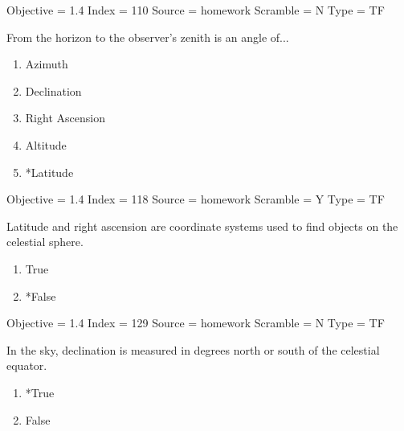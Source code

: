 \documentclass[11pt]{article}
\begin{document}
\begin{enumerate}
\begin{minipage}{\textwidth}
\begin{minipage}{\textwidth}
Objective = 1.4
Index = 110
Source = homework
Scramble = N
Type = TF
\end{minipage}
\end{minipage}
\vskip 0.20in

\begin{minipage}{\textwidth}
\begin{minipage}{\textwidth}
\item From the horizon to the observer's zenith is an angle of...
\begin{multicols}{3}
\begin{enumerate} 
\setlength{\itemsep}{1pt} 
\setlength{\parskip}{0pt} 
\setlength{\parsep}{0pt}
\setlength{\multicolsep}{1pt} 
\item Azimuth
\item Declination
\item Right Ascension
\item Altitude
\item *Latitude
\end{enumerate} 
\vfill 
\end{multicols}

Objective = 1.4
Index = 118
Source = homework
Scramble = Y
Type = TF
\end{minipage}
\end{minipage}
\vskip 0.20in

\begin{minipage}{\textwidth}
\begin{minipage}{\textwidth}
\item Latitude and right ascension are coordinate systems used to find objects on the celestial sphere.
\begin{multicols}{3}
\begin{enumerate} 
\setlength{\itemsep}{1pt} 
\setlength{\parskip}{0pt} 
\setlength{\parsep}{0pt}
\setlength{\multicolsep}{1pt} 
\item True
\item *False
\end{enumerate} 
\vfill 
\end{multicols}

Objective = 1.4
Index = 129
Source = homework
Scramble = N
Type = TF
\end{minipage}
\end{minipage}
\vskip 0.20in

\begin{minipage}{\textwidth}
\begin{minipage}{\textwidth}
\item In the sky, declination is measured in degrees north or south of the celestial equator.
\begin{multicols}{3}
\begin{enumerate} 
\setlength{\itemsep}{1pt} 
\setlength{\parskip}{0pt} 
\setlength{\parsep}{0pt}
\setlength{\multicolsep}{1pt} 
\item *True
\item False
\end{enumerate} 
\vfill 
\end{multicols}


\end{minipage}
\end{minipage}
\end{enumerate}
\end{document}
